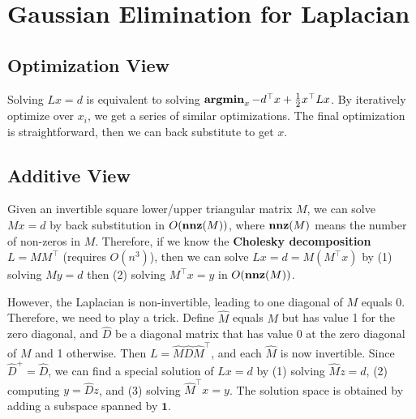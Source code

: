 \section{Gaussian Elimination for Laplacian}

\subsection{Optimization View}

Solving $Lx = d$ is equivalent to solving $\operatorname{\textbf{argmin}}_x -d^\top x + \frac{1}{2} x^\top L x$. By iteratively optimize over $x_i$, we get a series of similar optimizations. The final optimization is straightforward, then we can back substitute to get $x$.

\subsection{Additive View}

Given an invertible square lower/upper triangular matrix $M$, we can solve $Mx=d$ by back substitution in $O(\operatorname{\textbf{nnz}}(M))$, where $\operatorname{\textbf{nnz}}(M)$ means the number of non-zeros in $M$. Therefore, if we know the \textbf{Cholesky decomposition} $L = M M^\top$ (requires $O(n^3)$), then we can solve $Lx =d = M (M^\top x)$ by (1) solving $M y =d$ then (2) solving $M^\top x =y$ in $O(\operatorname{\textbf{nnz}}(M))$.

However, the Laplacian is non-invertible, leading to one diagonal of $M$ equals 0. Therefore, we need to play a trick. Define $\hat{M}$ equals $M$ but has value 1 for the zero diagonal, and $\hat{D}$ be a diagonal matrix that has value 0 at the zero diagonal of $M$ and 1 otherwise. Then $L = \hat{M} \hat{D} \hat{M}^\top$, and each $\hat{M}$ is now invertible. Since $\hat{D}^+ = \hat{D}$, we can find a special solution of $Lx=d$ by (1) solving $\hat{M} z = d$, (2) computing $y = \hat{D} z$, and (3) solving $\hat{M}^\top x = y$. The solution space is obtained by adding a subspace spanned by $\boldsymbol{1}$.